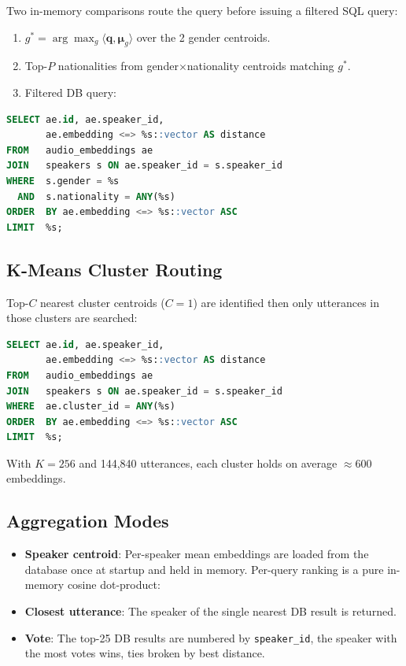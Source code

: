 \documentclass[12pt, a4paper]{article}
\newcommand{\code}[1]{\texttt{#1}}
\begin{document}
Two in-memory comparisons route the query before issuing a filtered
SQL query:
\begin{enumerate}
  \item $g^* = \arg\max_{g}\langle\mathbf{q},\boldsymbol{\mu}_g\rangle$
        over the 2 gender centroids.
  \item Top-$P$ nationalities from gender$\times$nationality
        centroids matching $g^*$.
  \item Filtered DB query:
\end{enumerate}

\begin{lstlisting}[language=SQL, numbers=none,
    caption={Metadata-hierarchy filtered query.}]
SELECT ae.id, ae.speaker_id,
       ae.embedding <=> %s::vector AS distance
FROM   audio_embeddings ae
JOIN   speakers s ON ae.speaker_id = s.speaker_id
WHERE  s.gender = %s
  AND  s.nationality = ANY(%s)
ORDER  BY ae.embedding <=> %s::vector ASC
LIMIT  %s;
\end{lstlisting}
\newpage
\subsection{K-Means Cluster Routing}

Top-$C$ nearest cluster centroids ($C{=}1$) are identified
then only utterances in those clusters are searched:

\begin{lstlisting}[language=SQL, numbers=none,
    caption={$K$-means cluster-routed query.}]
SELECT ae.id, ae.speaker_id,
       ae.embedding <=> %s::vector AS distance
FROM   audio_embeddings ae
JOIN   speakers s ON ae.speaker_id = s.speaker_id
WHERE  ae.cluster_id = ANY(%s)
ORDER  BY ae.embedding <=> %s::vector ASC
LIMIT  %s;
\end{lstlisting}

With $K{=}256$ and 144,840 utterances, each cluster holds on average
${\approx}600$ embeddings.

\subsection{Aggregation Modes}
\begin{itemize}
    \item \textbf{Speaker centroid}: Per-speaker mean embeddings are
        loaded from the database once at startup and held in memory.
        Per-query ranking is a pure in-memory cosine dot-product:

  \item \textbf{Closest utterance}: The speaker of the single nearest
        DB result is returned.
  \item \textbf{Vote}: The top-25 DB results are numbered by
        \code{speaker\_id}, the speaker with the most votes wins, ties broken by best distance.
\end{itemize}
\end{document}
